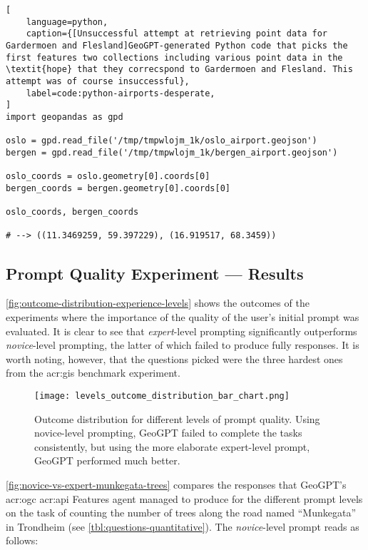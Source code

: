 \FloatBarrier

\begin{lstlisting}[
    language=python,
    caption={[Unsuccessful attempt at retrieving point data for Gardermoen and Flesland]GeoGPT-generated Python code that picks the first features two collections including various point data in the \textit{hope} that they correcspond to Gardermoen and Flesland. This attempt was of course insuccessful},
    label=code:python-airports-desperate,
]
import geopandas as gpd

oslo = gpd.read_file('/tmp/tmpwlojm_1k/oslo_airport.geojson')
bergen = gpd.read_file('/tmp/tmpwlojm_1k/bergen_airport.geojson')

oslo_coords = oslo.geometry[0].coords[0]
bergen_coords = bergen.geometry[0].coords[0]

oslo_coords, bergen_coords   

# --> ((11.3469259, 59.397229), (16.919517, 68.3459))
\end{lstlisting}

\subsection{Prompt Quality Experiment --- Results}
\label{subsec:prompt-quality-test-results}

\autoref{fig:outcome-distribution-experience-levels} shows the outcomes of the experiments where the importance of the quality of the user's initial prompt was evaluated. It is clear to see that \textit{expert}-level prompting significantly outperforms \textit{novice}-level prompting, the latter of which failed to produce fully responses. It is worth noting, however, that the questions picked were the three hardest ones from the \acrshort{acr:gis} benchmark experiment.

\begin{figure}[htbp]
    \centering
    \texttt{[image: levels\_outcome\_distribution\_bar\_chart.png]}
    \caption[Outcome distribution for different levels of prompt quality]{Outcome distribution for different levels of prompt quality. Using novice-level prompting, GeoGPT failed to complete the tasks consistently, but using the more elaborate expert-level prompt, GeoGPT performed much better.}
    \label{fig:outcome-distribution-experience-levels}
\end{figure}

\autoref{fig:novice-vs-expert-munkegata-trees} compares the responses that GeoGPT's \acrshort{acr:ogc} \acrshort{acr:api} Features agent managed to produce for the different prompt levels on the task of counting the number of trees along the road named \enquote{Munkegata} in Trondheim (see \autoref{tbl:questions-quantitative}). The \textit{novice}-level prompt reads as follows:

